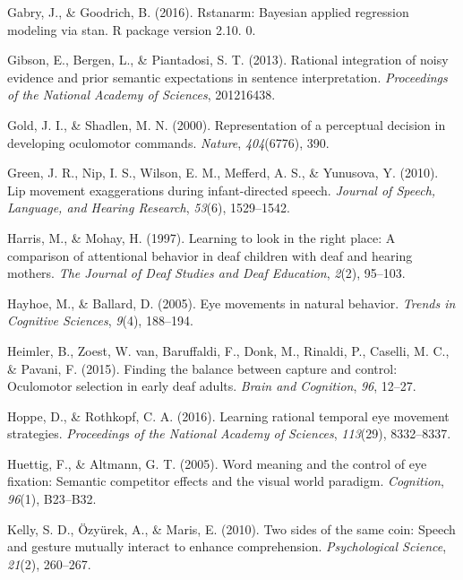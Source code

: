 \documentclass[english,floatsintext,man]{apa6}
\begin{document}
\leavevmode\hypertarget{ref-gabry2016rstanarm}{}%
Gabry, J., \& Goodrich, B. (2016). Rstanarm: Bayesian applied regression
modeling via stan. R package version 2.10. 0.

\leavevmode\hypertarget{ref-gibson2013rational}{}%
Gibson, E., Bergen, L., \& Piantadosi, S. T. (2013). Rational
integration of noisy evidence and prior semantic expectations in
sentence interpretation. \emph{Proceedings of the National Academy of
Sciences}, 201216438.

\leavevmode\hypertarget{ref-gold2000representation}{}%
Gold, J. I., \& Shadlen, M. N. (2000). Representation of a perceptual
decision in developing oculomotor commands. \emph{Nature},
\emph{404}(6776), 390.

\leavevmode\hypertarget{ref-green2010lip}{}%
Green, J. R., Nip, I. S., Wilson, E. M., Mefferd, A. S., \& Yunusova, Y.
(2010). Lip movement exaggerations during infant-directed speech.
\emph{Journal of Speech, Language, and Hearing Research}, \emph{53}(6),
1529--1542.

\leavevmode\hypertarget{ref-harris1997learning}{}%
Harris, M., \& Mohay, H. (1997). Learning to look in the right place: A
comparison of attentional behavior in deaf children with deaf and
hearing mothers. \emph{The Journal of Deaf Studies and Deaf Education},
\emph{2}(2), 95--103.

\leavevmode\hypertarget{ref-hayhoe2005eye}{}%
Hayhoe, M., \& Ballard, D. (2005). Eye movements in natural behavior.
\emph{Trends in Cognitive Sciences}, \emph{9}(4), 188--194.

\leavevmode\hypertarget{ref-heimler2015finding}{}%
Heimler, B., Zoest, W. van, Baruffaldi, F., Donk, M., Rinaldi, P.,
Caselli, M. C., \& Pavani, F. (2015). Finding the balance between
capture and control: Oculomotor selection in early deaf adults.
\emph{Brain and Cognition}, \emph{96}, 12--27.

\leavevmode\hypertarget{ref-hoppe2016learning}{}%
Hoppe, D., \& Rothkopf, C. A. (2016). Learning rational temporal eye
movement strategies. \emph{Proceedings of the National Academy of
Sciences}, \emph{113}(29), 8332--8337.

\leavevmode\hypertarget{ref-huettig2005word}{}%
Huettig, F., \& Altmann, G. T. (2005). Word meaning and the control of
eye fixation: Semantic competitor effects and the visual world paradigm.
\emph{Cognition}, \emph{96}(1), B23--B32.

\leavevmode\hypertarget{ref-kelly2010two}{}%
Kelly, S. D., Özyürek, A., \& Maris, E. (2010). Two sides of the same
coin: Speech and gesture mutually interact to enhance comprehension.
\emph{Psychological Science}, \emph{21}(2), 260--267.
\end{document}
